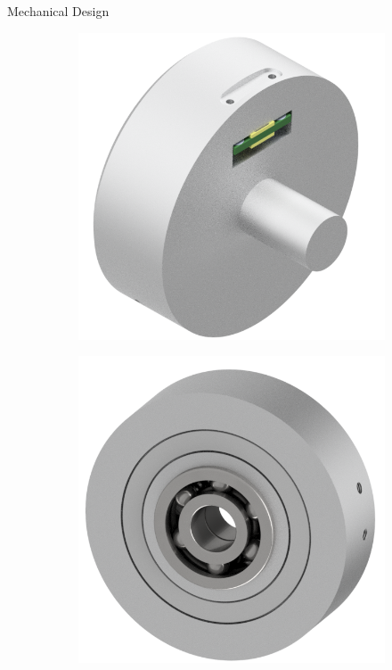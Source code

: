 \documentclass[mathserif]{beamer}
\begin{document}
\begin{frame}{Mechanical Design}
	\begin{figure}
	\centering
	\begin{subfigure}{.5\textwidth}
	  \centering
	  \includegraphics[width=.9\linewidth]{graphics/joint_read_side}
	\end{subfigure}%
	\begin{subfigure}{.5\textwidth}
	  \centering
	  \includegraphics[width=.9\linewidth]{graphics/joint_mag_assembly}
	\end{subfigure}
	\end{figure}
\end{frame}
\end{document}
